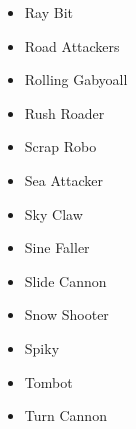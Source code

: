 \begin{itemize}
	\item \hypertarget{enem:Ray_Bit}{Ray Bit}
	\item \hypertarget{enem:Road_Attackers}{Road Attackers}
	\item \hypertarget{enem:Rolling_Gabyoall}{Rolling Gabyoall}
	\item \hypertarget{enem:Rush_Roader}{Rush Roader}
	\item \hypertarget{enem:Scrap_Robo}{Scrap Robo}
	\item \hypertarget{enem:Sea_Attacker}{Sea Attacker}
	\item \hypertarget{enem:Sky_Claw}{Sky Claw}
	\item \hypertarget{enem:Sine_Faller}{Sine Faller}
	\item \hypertarget{enem:Slide_Cannon}{Slide Cannon}
	\item \hypertarget{enem:Snow_Shooter}{Snow Shooter}
	\item \hypertarget{enem:Spiky}{Spiky}
	\item \hypertarget{enem:Tombot}{Tombot}
	\item \hypertarget{enem:Turn_Cannon}{Turn Cannon}
	








\end{itemize}









